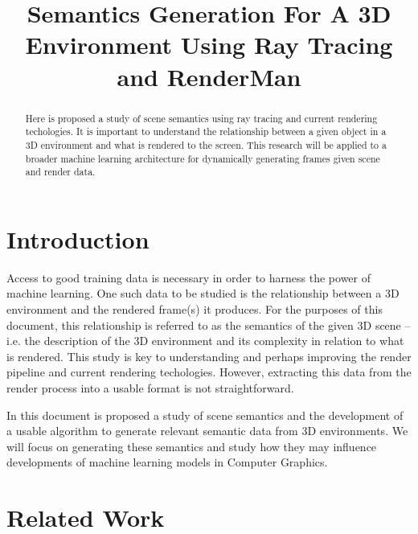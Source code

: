 \documentclass[conference]{IEEEtran}
\begin{document}
\title{Semantics Generation For A 3D Environment Using Ray Tracing and RenderMan}

\author{
}

\maketitle

\begin{abstract}
Here is proposed a study of scene semantics
using ray tracing and current rendering techologies.
It is important to understand the relationship between
a given object in a 3D environment and what is rendered to
the screen.
This research will be applied to a broader machine learning
architecture for dynamically generating frames
given scene and render data.
\end{abstract}

\section{Introduction}
\label{sec:introduction}
Access to good training data is necessary
in order to harness the power of machine learning.
One such data to be studied is the relationship
between a 3D environment and the
rendered frame(s) it produces.
For the purposes of this document, this relationship is
referred to as the semantics of the given 3D scene --
i.e. the description of the 3D environment and its complexity
in relation to what is rendered.
This study is key to understanding and perhaps improving the
render pipeline and current rendering techologies.
However, extracting this data from the render process into a usable
format is not straightforward.

In this document is proposed a study of scene semantics and the development of a
usable algorithm to generate relevant semantic data from 3D environments.
We will focus on generating these semantics and study
how they may influence developments of
machine learning models in Computer Graphics.

\section{Related Work}
\label{sec:related_work}
\end{document}
